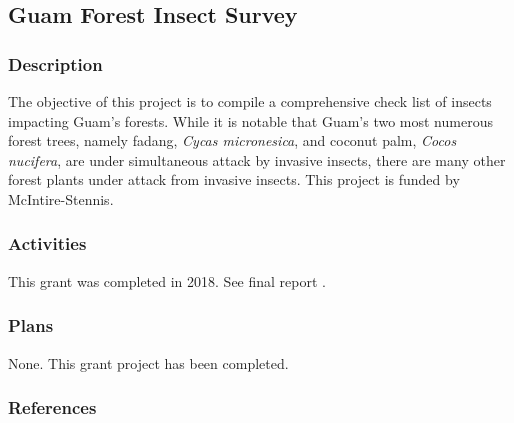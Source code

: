 \subsection{Guam Forest Insect Survey}
\begin{refsection}
	
	\subsubsection{Description}
	
	The objective of this project is to compile a comprehensive check
	list of insects impacting Guam's forests. While it is notable that
	Guam's two most numerous forest trees, namely fadang, \emph{Cycas
		micronesica}, and coconut palm, \emph{Cocos nucifera}, are under simultaneous
	attack by invasive insects, there are many other forest plants under
	attack from invasive insects. This project is funded by McIntire-Stennis.
	
	\subsubsection{Activities}
	
	This grant was completed in 2018. See final report \cite{moore_aubreymoore/mcintire-stennis_2018}.
	
	\begin{comment}
	\raggedright\vspace{2mm}\textbf{Activity}
	\begin{itemize}
	\item I work closely with Jim McConnell's Guam Plant Extinction Prevention
	Program. Many of Guam's rare plants are being attacked by invasive
	insects. I routinely identify and document insect specimens collected
	from the GPEPP plant nursery and from field surveys.
	\item Annual report \cite{moore2018mcintirestennis2}.
	\item Proposal \cite{moore2018mcintirestennis}.
	\end{itemize}
	\raggedright\vspace{2mm}\textbf{Reference(s)}
	
	\begin{btSect}[vancouver]{zotero}
	\btPrintCited
	\end{btSect}
	\newpage{}
	\end{btUnit}
	
	\begin{btUnit}
	\end{comment}
	
	\subsubsection{Plans}
	
	None. This grant project has been completed.
	
	\subsubsection{References}
	\printbibliography[heading=none]
\end{refsection}


